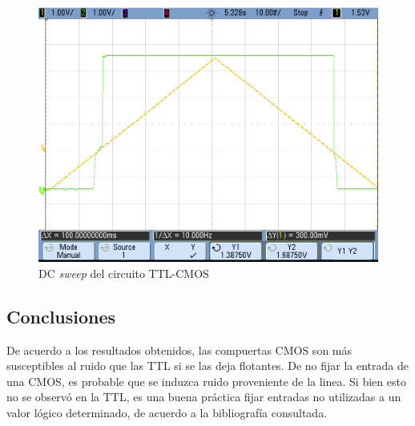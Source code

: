 \documentclass[../../e3_tp2_main.tex]{subfiles}
\begin{document}
\begin{figure}[H]
	\centering
	\includegraphics[scale=0.3]{../mediciones/e3_tp2_5_1.png}
	\caption{DC \textit{sweep} del circuito TTL-CMOS}
\end{figure}



\subsection{Conclusiones}

De acuerdo a los resultados obtenidos, las compuertas CMOS son m\'as susceptibles al ruido que las TTL si se las deja flotantes. De no fijar la entrada de una CMOS, es probable que se induzca ruido proveniente de la linea. Si bien esto no se observ\'o en la TTL, es una buena pr\'actica fijar entradas no utilizadas a un valor l\'ogico determinado, de acuerdo a la bibliograf\'ia consultada.
\end{document}

